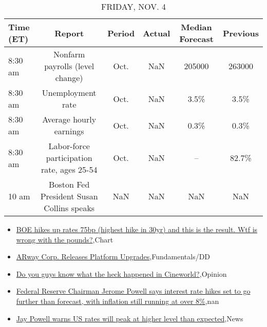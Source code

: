 \documentclass{article}%
\begin{document}
%


\begin{table}[htbp]%
\caption{FRIDAY, NOV. 4}%
\centering%
\begin{adjustbox}{width=1\textwidth}%
\begin{tabular}{lccccc}
\toprule
Time (ET) &                                     Report & Period & Actual & Median Forecast & Previous \\
\midrule
  8:30 am &            Nonfarm payrolls (level change) &   Oct. &    NaN &          205000 &   263000 \\
  8:30 am &                          Unemployment rate &   Oct. &    NaN &            3.5\% &     3.5\% \\
  8:30 am &                    Average hourly earnings &   Oct. &    NaN &            0.3\% &     0.3\% \\
  8:30 am & Labor-force participation rate, ages 25-54 &   Oct. &    NaN &              -- &    82.7\% \\
    10 am &  Boston Fed President Susan Collins speaks &    NaN &    NaN &             NaN &      NaN \\
\bottomrule
\end{tabular}
%
\end{adjustbox}%
\end{table}

%
\begin{itemize}%
\item%
\href{https://reddit.com/r/wallstreetbets/comments/yl1rg0/boe\_hikes\_up\_rates\_75bp\_highest\_hike\_in\_30yr\_and/}{BOE hikes up rates 75bp (highest hike in 30yr) and this is the result. Wtf is wrong with the pounds?},Chart%
\item%
\href{https://reddit.com/r/StockMarket/comments/yl1boy/arway\_corp\_releases\_platform\_upgrades/}{ARway Corp. Releases Platform Upgrades},Fundamentals/DD%
\item%
\href{https://reddit.com/r/StockMarket/comments/ykuuqc/do\_you\_guys\_know\_what\_the\_heck\_happened\_in/}{Do you guys know what the heck happened in Cineworld?},Opinion%
\item%
\href{https://reddit.com/r/Economics/comments/ykx6ne/federal\_reserve\_chairman\_jerome\_powell\_says/}{Federal Reserve Chairman Jerome Powell says interest rate hikes set to go further than forecast, with inflation still running at over 8\%},nan%
\item%
\href{https://reddit.com/r/Economics/comments/ykvc6d/jay\_powell\_warns\_us\_rates\_will\_peak\_at\_higher/}{Jay Powell warns US rates will peak at higher level than expected},News%
\end{itemize}%
\end{document}
